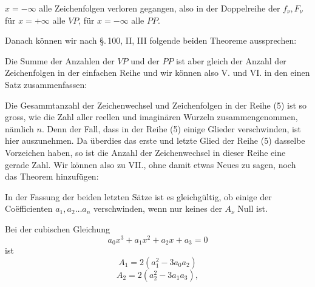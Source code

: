 $x = -\infty$ alle Zeichenfolgen verloren gegangen, also in der Doppelreihe der $f_\nu, F_\nu$ für $x = +\infty$ alle $VP$, für $x = -\infty$ alle $PP$.

Danach können wir nach \S.\,100, II, III folgende beiden Theoreme aussprechen:



Die Summe der Anzahlen der $VP$ und der $PP$ ist aber gleich der Anzahl der Zeichenfolgen in der einfachen Reihe
und wir können also V. und VI. in den einen Satz zusammenfassen:


Die Gesammtanzahl der Zeichenwechsel und Zeichenfolgen in der Reihe (5) ist so gross, wie die Zahl aller reellen und imaginären Wurzeln zusammengenommen, nämlich $n$. Denn der Fall, dass in der Reihe (5) einige Glieder verschwinden, ist hier auszunehmen. Da überdies das erste und letzte Glied der Reihe (5) dasselbe Vorzeichen haben, so ist die Anzahl der Zeichenwechsel in dieser Reihe eine gerade Zahl. Wir können also zu VII., ohne damit etwas Neues zu sagen, noch das Theorem hinzufügen:


In der Fassung der beiden letzten Sätze ist es gleichgültig, ob einige der Coëfficienten $a_1, a_2 \ldots a_n$ verschwinden, wenn nur keines der $A_\nu$ Null ist.

Bei der cubischen Gleichung
\[
a_0 x^3 + a_1 x^2 + a_2 x + a_3 = 0
\]
ist
\[
A_1 = 2(a_1^2 - 3a_0a_2)
\]
\[
A_2 = 2(a_2^2 - 3a_1a_3),
\]
